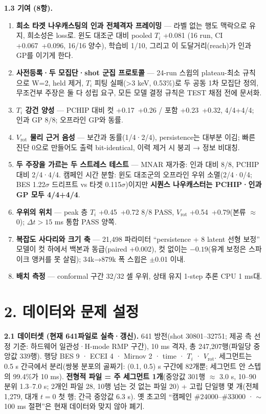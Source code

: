 \documentclass[10pt,a4paper]{article}
\newcommand{\Ti}{\ensuremath{T_i}}
\newcommand{\Vrot}{\ensuremath{V_\mathrm{rot}}}
\begin{document}
\textbf{1.3 기여 (8항).}
\begin{enumerate}
\item \textbf{희소 타겟 나우캐스팅의 인과 전체격자 프레이밍} — 라벨 없는 행도 맥락으로 유지, 희소성은 loss로. 윈도 대조군 대비 pooled \Ti{} +0.081 (16 run, CI +0.067~+0.096, 16/16 양수), 학습비 1/10, 그리고 이 도달거리(reach)가 인과 GP를 이기게 한다.
\item \textbf{사전등록·두 모집단·shot 군집 프로토콜} — 24-run 스윕의 plateau-최소 규칙으로 W=2, held 제거, \Ti{} 피팅 실패(>3 keV, 0.53\%)로 두 공동 1차 모집단 정의, 무조건부 주장은 둘 다 성립 요구, 모든 모델 결정 규칙은 TEST 채점 전에 문서화.
\item \textbf{\Ti{} 강건 양성} — PCHIP 대비 컷 +0.17~+0.26 / 포함 +0.23~+0.32, 4/4+4/4; 인과 GP 8/8; 오프라인 GP와 동률.
\item \textbf{\Vrot{} 물리 근거 음성} — 보간과 동률(1/4·2/4), persistence는 대부분 이김; 빠른 진단 0으로 만들어도 출력 bit-identical, 이력 제거 시 붕괴 → 정보 비대칭.
\item \textbf{두 주장을 가르는 두 스트레스 테스트} — MNAR 재가중: 인과 대비 8/8, PCHIP 대비 2/4·4/4. 캠페인 시간 분할: 윈도 대조군의 오프라인 우위 소멸(2/4·0/4; BES 1.22$\sigma$ 드리프트 vs 타겟 0.115$\sigma$)이지만 \textbf{시퀀스 나우캐스터는 PCHIP·인과 GP 모두 4/4+4/4}.
\item \textbf{우위의 위치} — peak 층 \Ti{} +0.45~+0.72 8/8 PASS, \Vrot{} +0.54~+0.79(본류 $\approx$0); $\Delta t>15$ ms 통합 PASS 양쪽.
\item \textbf{복잡도 사다리와 크기 축} — 21,498 파라미터 ``persistence + 8 latent 선형 보정'' 모델이 컷 하에서 백본과 동급(paired +0.002), 컷 없이는 $-0.19$(유계 보정은 스파이크 앵커를 못 살림); 34k→879k 폭 스윕은 $\pm$0.01 이내.
\item \textbf{배치 측정} — conformal 구간 32/32 셀 우위, 상태 유지 1-step 추론 CPU 1 ms대.
\end{enumerate}

\section*{2. 데이터와 문제 설정}
\textbf{2.1 데이터셋 (현재 641파일로 실측·갱신).} 641 방전(shot 30801–32751; 제공 측 선정 기준: 하드웨어 일관성·H-mode RMP 구간), 10 ms 격자, 총 247,207행(파일당 중앙값 339행). 행당 BES 9 · ECEI 4 · Mirnov 2 · time · \Ti{} · \Vrot. 세그먼트는 0.5 s 간극에서 분리(쌍봉 분포의 골짜기: (0.1, 0.5) s 구간에 82개뿐; 세그먼트 안 스텝의 99.4\%가 10 ms). \textbf{전형적 파일 = 주 세그먼트 1개}(중앙값 301행 $\approx$ 3.0 s, 10–90분위 1.3–7.0 s; 2개인 파일 28, 10행 넘는 것 없는 파일 20) + 고립 단일행 몇 개(전체 1,279, 대개 $t=0$ 첫 행; 간극 중앙값 6.3 s). 옛 초고의 ``캠페인 \#24000–\#33000 · $\sim$100 ms 절편''은 현재 데이터와 맞지 않아 폐기.
\end{document}
